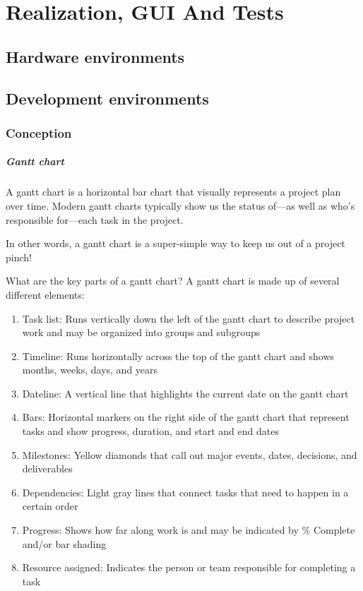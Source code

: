 

\setcounter{mtc}{11}

\chapter{Realization, GUI And Tests}%
\label{chap:chapter_four}
\minitoc

\section{Hardware environments}
\section{Development environments}
\subsection{Conception}


\paragraph{Gantt chart}
A gantt chart is a horizontal bar chart that visually represents a project plan over time. Modern gantt charts typically show us the status of—as well as who’s responsible for—each task in the project.

In other words, a gantt chart is a super-simple way to keep us out of a project pinch!

What are the key parts of a gantt chart?
A gantt chart is made up of several different elements:
\begin{enumerate}
      \item
            Task list: Runs vertically down the left of the gantt chart to describe project work and may be organized into groups and subgroups
      \item
            Timeline: Runs horizontally across the top of the gantt chart and shows months, weeks, days, and years
      \item
            Dateline: A vertical line that highlights the current date on the gantt chart
      \item
            Bars: Horizontal markers on the right side of the gantt chart that represent tasks and show progress, duration, and start and end dates
      \item
            Milestones: Yellow diamonds that call out major events, dates, decisions, and deliverables
      \item
            Dependencies: Light gray lines that connect tasks that need to happen in a certain order
      \item
            Progress: Shows how far along work is and may be indicated by \% Complete and/or bar shading
      \item
            Resource assigned: Indicates the person or team responsible for completing a task
\end{enumerate}


